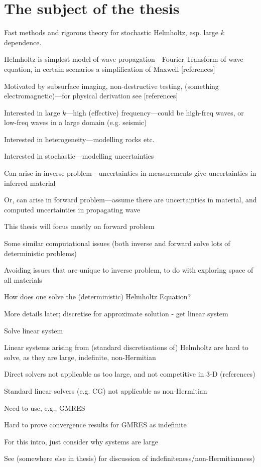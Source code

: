 \section{The subject of the thesis}

\bit
\item Fast methods and rigorous theory for stochastic Helmholtz, esp. large $k$ dependence.
\item Helmholtz is simplest model of wave propagation---Fourier Transform of wave equation, in certain scenarios a simplification of Maxwell [references]
\item Motivated by subsurface imaging, non-destructive testing, (something electromagnetic)---for physical derivation see [references]
\item Interested in large $k$---high (effective) frequency---could be high-freq waves, or low-freq waves in a large domain (e.g. seismic)
\item Interested in heterogeneity---modelling rocks etc.
\item Interested in stochastic---modelling uncertainties
\bit
\item Can arise in inverse problem - uncertainties in measurements give uncertainties in inferred material
\item Or, can arise in forward problem---assume there are uncertainties in material, and computed uncertainties in propagating wave
\eit
\item This thesis will focus mostly on forward problem
\bit
\item Some similar computational issues (both inverse and forward solve lots of deterministic problems)
\item Avoiding issues that are unique to inverse problem, to do with exploring space of all materials
\eit
\eit

\bit
\item How does one solve the (deterministic) Helmholtz Equation?
\item More details later; discretise for approximate solution - get linear system
\item Solve linear system
\item Linear systems arising from (standard discretisations of) Helmholtz are hard to solve, as they are large, indefinite, non-Hermitian
\item Direct solvers not applicable as too large, and not competitive in 3-D (references)
\item Standard linear solvers (e.g. CG) not applicable as non-Hermitian
\item Need to use, e.g., GMRES
\item Hard to prove convergence results for GMRES as indefinite
\item For this intro, just consider why systems are large
\item See (somewhere else in thesis) for discussion of indefiniteness/non-Hermitianness)
\eit
